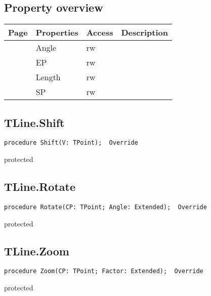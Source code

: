 \subsection{Property overview}
\label{hmi:drawncontrol:tline:properties}
\begin{tabularx}{\textwidth}{lllX}
Page & Properties & Access & Description \\ \hline
\pageref{hmi:drawncontrol:tline:angle} & Angle & rw &  \\
\pageref{hmi:drawncontrol:tline:ep} & EP & rw &  \\
\pageref{hmi:drawncontrol:tline:length} & Length & rw &  \\
\pageref{hmi:drawncontrol:tline:sp} & SP & rw &  \\
\hline
\end{tabularx}
\subsection{TLine.Shift}
\label{hmi:drawncontrol:tline:shift}
\begin{FPCList}
\Declaration 

\begin{verbatim}
procedure Shift(V: TPoint);  Override
\end{verbatim}
\Visibility
protected
\end{FPCList}
\subsection{TLine.Rotate}
\label{hmi:drawncontrol:tline:rotate}
\begin{FPCList}
\Declaration 

\begin{verbatim}
procedure Rotate(CP: TPoint; Angle: Extended);  Override
\end{verbatim}
\Visibility
protected
\end{FPCList}
\subsection{TLine.Zoom}
\label{hmi:drawncontrol:tline:zoom}
\begin{FPCList}
\Declaration 

\begin{verbatim}
procedure Zoom(CP: TPoint; Factor: Extended);  Override
\end{verbatim}
\Visibility
protected
\end{FPCList}
